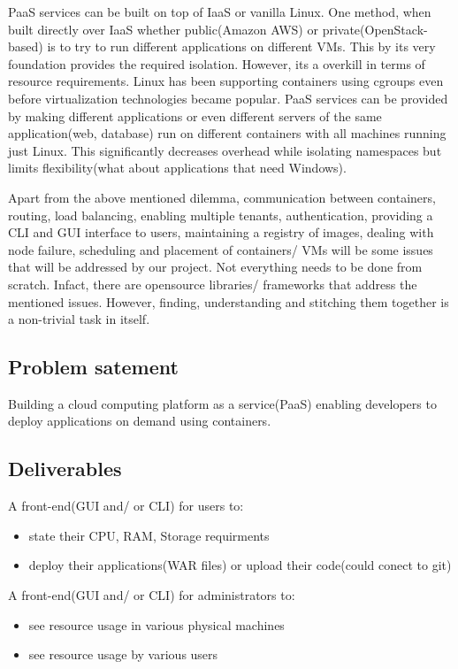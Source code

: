 \documentclass[a4paper]{article}
\begin{document}
  PaaS services can be built on top of IaaS or vanilla Linux. One method, when built directly over IaaS whether public(Amazon AWS) or private(OpenStack-based) is to try to run different applications on different VMs. This by its very foundation provides the required isolation. However, its a overkill in terms of resource requirements. Linux has been supporting containers using cgroups even before virtualization technologies became popular. PaaS services can be provided by making different applications or even different servers of the same application(web, database) run on different containers with all machines running just Linux. This significantly decreases overhead while isolating namespaces but limits flexibility(what about applications that need Windows). 
  
  Apart from the above mentioned dilemma, communication between containers, routing, load balancing, enabling multiple tenants, authentication, providing a CLI and GUI interface to users, maintaining a registry of images, dealing with node failure, scheduling and placement of containers/ VMs will be some issues that will be addressed by our project. Not everything needs to be done from scratch. Infact, there are opensource libraries/ frameworks that address the mentioned issues. However, finding, understanding and stitching them together is a non-trivial task in itself.
  
  \subsection{Problem satement}
	
  Building a cloud computing platform as a service(PaaS) enabling developers to deploy applications on demand using containers.
	
  \subsection{Deliverables}

  A front-end(GUI and/ or CLI) for users to:
  \begin{itemize}
	  \item state their CPU, RAM, Storage requirments
	  \item deploy their applications(WAR files) or upload their code(could conect to git)
  \end{itemize}
  
  A front-end(GUI and/ or CLI) for administrators to:
  \begin{itemize}
	  \item see resource usage in various physical machines
	  \item see resource usage by various users
  \end{itemize}
  
\end{document}
